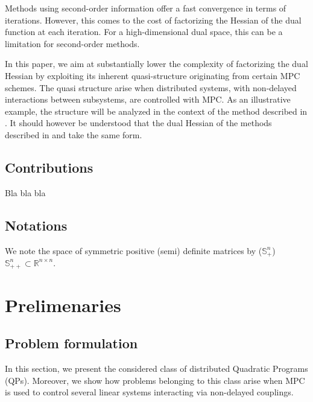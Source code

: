 Methods using second-order information offer a fast convergence in terms of iterations. However, this comes to the cost of factorizing the Hessian of the dual function at each iteration. For a high-dimensional dual space, this can be a limitation for second-order methods.

In this paper, we aim at substantially lower the complexity of factorizing the dual Hessian by exploiting its inherent quasi-structure originating from certain MPC schemes. The quasi structure arise when distributed systems, with non-delayed interactions between subsystems, are controlled with MPC. As an illustrative example, the structure will be analyzed in the context of the method described in \cite{Necoara2009a}. It should however be understood that the dual Hessian of the methods described in \cite{Quoc2013} and \cite{Klintberg2014} take the same form.

\subsection{Contributions} Bla bla bla

\subsection{Notations} We note the space of symmetric positive (semi) definite matrices by ($\mathbb{S}_{+}^n$) $\mathbb{S}_{++}^n \subset \mathbb{R}^{n \times n}$.


\section{Prelimenaries}

\subsection{Problem formulation}
In this section, we present the considered class of distributed Quadratic Programs (QPs). Moreover, we show how problems belonging to this class arise when MPC is used to control several linear systems interacting via non-delayed couplings.

